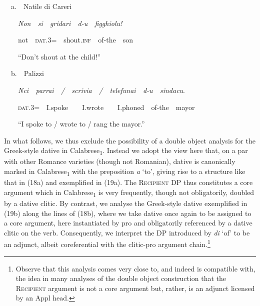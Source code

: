 \documentclass[output=paper,modfonts,nonflat]{langsci/langscibook}
\begin{document}
\begin{listWWNumviiileveli}
\item 
\begin{styleListParagraph}
\ \ a.\ \ Natile di Careri
\end{styleListParagraph}
\end{listWWNumviiileveli}
\begin{styleStandard}
\ \ \ \ \textit{Non\ \ si\ \ gridari\ \ d-u\ \ figghiolu!}
\end{styleStandard}

\begin{styleStandard}
\ \ \ \ not\ \ \textsc{dat}.3=\ \ shout.\textsc{inf}\ \ of-the\ \ son
\end{styleStandard}

\begin{styleStandard}
\ \  \ \ “Don’t shout at the child!”
\end{styleStandard}

\begin{styleStandard}
\ \ b.\ \ Palizzi\ \ 
\end{styleStandard}

\begin{styleStandard}
\ \ \ \ \textit{Nci\ \ parrai\ \ /\ \ scrivia\ \ /\ \ telefunai\ \ d-u\ \ sindacu}.
\end{styleStandard}

\begin{styleStandard}
\ \ \ \ \textsc{dat}.3=\ \ I.spoke\ \ \ \ I.wrote\ \ \ \ I.phoned\ \ of-the\ \ mayor
\end{styleStandard}

\begin{styleStandard}
\ \ \ \ “I spoke to / wrote to / rang the mayor.”
\end{styleStandard}

\begin{styleStandard}
In what follows, we thus exclude the possibility of a double object analysis for the Greek-style dative in Calabrese\textsubscript{1}. Instead we adopt the view here that, on a par with other Romance varieties (though not Romanian), dative is canonically marked in Calabrese\textsubscript{1} with the preposition \textit{a }‘to’, giving rise to a structure like that in (18a) and exemplified in (19a). The \textsc{Recipient} DP thus constitutes a core argument which in Calabrese\textsubscript{1} is very frequently, though not obligatorily, doubled by a dative clitic. By contrast, we analyse the Greek-style dative exemplified in (19b) along the lines of (18b), where we take dative once again to be assigned to a core argument, here instantiated by pro and obligatorily referenced by a dative clitic on the verb. Consequently, we interpret the DP introduced by \textit{di }‘of’ to be an adjunct, albeit coreferential with the clitic-pro argument chain.\footnote{ Observe that this analysis comes very close to, and indeed is compatible with, the idea in many analyses of the double object construction that the \textsc{Recipient} argument is not a core argument but, rather, is an adjunct licensed by an Appl head.} 
\end{styleStandard}
\end{document}
